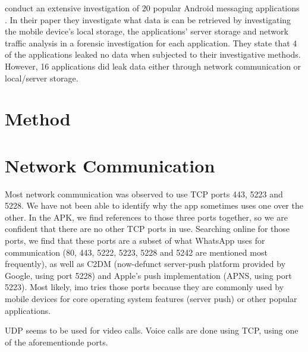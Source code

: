 \documentclass[conference]{IEEEtran}
\begin{document}
\citeauthor{walnycky2015network} conduct an extensive investigation of 20
popular Android messaging applications \cite{walnycky2015network}. In their
paper they investigate what data is can be retrieved by investigating the mobile
device's local storage, the applications' server storage and network traffic
analysis in a forensic investigation for each application. They state that 4 of
the applications leaked no data when subjected to their investigative methods.
However, 16 applications did leak data either through network communication or
local/server storage.





\section{Method}\label{sec:method}


\section{Network Communication}\label{sec:comm}

Most network communication was observed to use TCP ports 443, 5223 and 5228. We
have not been able to identify why the app sometimes uses one over the other.
In the APK, we find references to those three ports together, so we are
confident that there are no other TCP ports in use. Searching online for those
ports, we find that these ports are a subset of what WhatsApp uses for
communication (80, 443, 5222, 5223, 5228 and 5242 are mentioned most
frequently), as well as C2DM (now-defunct server-push platform provided by
Google, using port 5228) and Apple's push implementation (APNS, using port
5223). Most likely, imo tries those ports because they are commonly used by
mobile devices for core operating system features (server push) or other
popular applications.

UDP seems to be used for video calls. Voice calls are done using TCP, using one
of the aforementionde ports.
\end{document}
